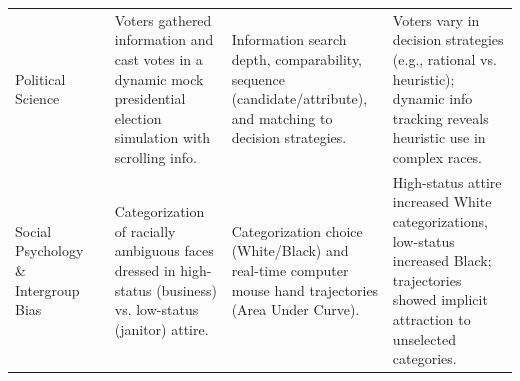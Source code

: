 \begin{table}[hbtp]
\begin{tabularx}{\textwidth}{@{}p{2.5cm} p{2cm} X X X@{}}
\addlinespace
Political Science & \citet{lau2006voters} & Voters gathered information and cast votes in a dynamic mock presidential election simulation with scrolling info. & Information search depth, comparability, sequence (candidate/attribute), and matching to decision strategies. & Voters vary in decision strategies (e.g., rational vs. heuristic); dynamic info tracking reveals heuristic use in complex races. \\
\addlinespace
Social Psychology \& Intergroup Bias & \citet{freeman2011looking} & Categorization of racially ambiguous faces dressed in high-status (business) vs. low-status (janitor) attire. & Categorization choice (White/Black) and real-time computer mouse hand trajectories (Area Under Curve). & High-status attire increased White categorizations, low-status increased Black; trajectories showed implicit attraction to unselected categories. \\
\bottomrule
\end{tabularx}
\end{table}
